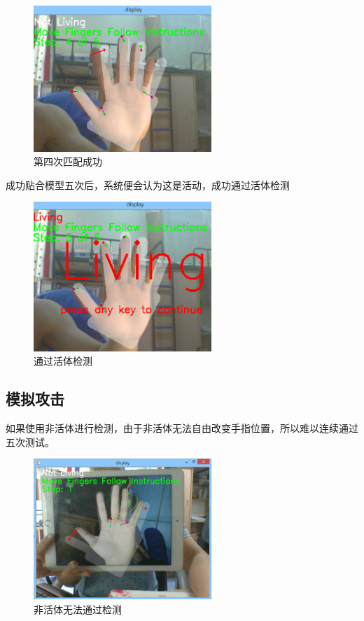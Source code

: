 \documentclass[UTF8, a4paper, fontset=none]{article}
\begin{document}
	\begin{figure}
    \centering
    \includegraphics[width=0.6\textwidth]{./test2.png}
    \caption{第四次匹配成功}
    \label{hand}
	\end{figure}
	
	成功贴合模型五次后，系统便会认为这是活动，成功通过活体检测
	
	\begin{figure}
    \centering
    \includegraphics[width=0.6\textwidth]{./finish.png}
    \caption{通过活体检测}
    \label{hand}
	\end{figure}

    \subsection{模拟攻击}
	
	如果使用非活体进行检测，由于非活体无法自由改变手指位置，所以难以连续通过五次测试。
	
	\begin{figure}
    \centering
    \includegraphics[width=0.6\textwidth]{./fault.jpg}
    \caption{非活体无法通过检测}
    \label{hand}
	\end{figure}
\end{document}
